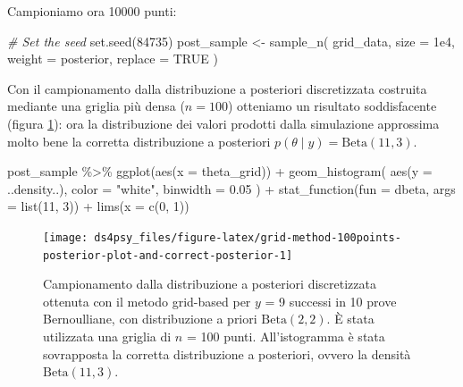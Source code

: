 \documentclass[
  11pt,
]{krantz}
\makeatletter
\newenvironment{Shaded}{\begin{snugshade}}{\end{snugshade}}
\newcommand{\AttributeTok}[1]{\textcolor[rgb]{0.61,0.61,0.61}{#1}}
\newcommand{\CommentTok}[1]{\textcolor[rgb]{0.37,0.37,0.37}{\textit{#1}}}
\newcommand{\ConstantTok}[1]{\textcolor[rgb]{0,0,0}{#1}}
\newcommand{\DecValTok}[1]{\textcolor[rgb]{0.06,0.06,0.06}{#1}}
\newcommand{\FloatTok}[1]{\textcolor[rgb]{0.06,0.06,0.06}{#1}}
\newcommand{\FunctionTok}[1]{\textcolor[rgb]{0,0,0}{#1}}
\newcommand{\NormalTok}[1]{#1}
\newcommand{\OtherTok}[1]{\textcolor[rgb]{0.37,0.37,0.37}{#1}}
\newcommand{\SpecialCharTok}[1]{\textcolor[rgb]{0,0,0}{#1}}
\newcommand{\StringTok}[1]{\textcolor[rgb]{0.5,0.5,0.5}{#1}}
\newenvironment{kframe}{%
\medskip{}
\setlength{\fboxsep}{.8em}
 \def\at@end@of@kframe{}%
 \ifinner\ifhmode%
  \def\at@end@of@kframe{\end{minipage}}%
  \begin{minipage}{\columnwidth}%
 \fi\fi%
 \def\FrameCommand##1{\hskip\@totalleftmargin \hskip-\fboxsep
 \colorbox{shadecolor}{##1}\hskip-\fboxsep
     \hskip-\linewidth \hskip-\@totalleftmargin \hskip\columnwidth}%
 \MakeFramed {\advance\hsize-\width
   \@totalleftmargin\z@ \linewidth\hsize
   \@setminipage}}%
 {\par\unskip\endMakeFramed%
 \at@end@of@kframe}
\renewenvironment{Shaded}{\begin{kframe}}{\end{kframe}}
\theoremstyle{definition}
\theoremstyle{definition}
\theoremstyle{definition}
\theoremstyle{definition}
\theoremstyle{remark}
\makeatother
\begin{document}
Campioniamo ora 10000 punti:

\begin{Shaded}
\begin{Highlighting}[]
\CommentTok{\# Set the seed}
\FunctionTok{set.seed}\NormalTok{(}\DecValTok{84735}\NormalTok{)}
\NormalTok{post\_sample }\OtherTok{\textless{}{-}} \FunctionTok{sample\_n}\NormalTok{(}
\NormalTok{  grid\_data,}
  \AttributeTok{size =} \FloatTok{1e4}\NormalTok{,}
  \AttributeTok{weight =}\NormalTok{ posterior,}
  \AttributeTok{replace =} \ConstantTok{TRUE}
\NormalTok{)}
\end{Highlighting}
\end{Shaded}

Con il campionamento dalla distribuzione a posteriori discretizzata costruita mediante una griglia più densa (\(n = 100\)) otteniamo un risultato soddisfacente (figura \ref{fig:grid-method-100points-posterior-plot-and-correct-posterior}): ora la distribuzione dei valori prodotti dalla simulazione approssima molto bene la corretta distribuzione a posteriori \(p(\theta \mid y) = \mbox{Beta}(11, 3)\).

\begin{Shaded}
\begin{Highlighting}[]
\NormalTok{post\_sample }\SpecialCharTok{\%\textgreater{}\%}
  \FunctionTok{ggplot}\NormalTok{(}\FunctionTok{aes}\NormalTok{(}\AttributeTok{x =}\NormalTok{ theta\_grid)) }\SpecialCharTok{+}
  \FunctionTok{geom\_histogram}\NormalTok{(}
    \FunctionTok{aes}\NormalTok{(}\AttributeTok{y =}\NormalTok{ ..density..),}
    \AttributeTok{color =} \StringTok{"white"}\NormalTok{,}
    \AttributeTok{binwidth =} \FloatTok{0.05}
\NormalTok{  ) }\SpecialCharTok{+}
  \FunctionTok{stat\_function}\NormalTok{(}\AttributeTok{fun =}\NormalTok{ dbeta, }\AttributeTok{args =} \FunctionTok{list}\NormalTok{(}\DecValTok{11}\NormalTok{, }\DecValTok{3}\NormalTok{)) }\SpecialCharTok{+}
  \FunctionTok{lims}\NormalTok{(}\AttributeTok{x =} \FunctionTok{c}\NormalTok{(}\DecValTok{0}\NormalTok{, }\DecValTok{1}\NormalTok{))}
\end{Highlighting}
\end{Shaded}

\begin{figure}[h]

{\centering \texttt{[image: ds4psy\_files/figure-latex/grid-method-100points-posterior-plot-and-correct-posterior-1]} 

}

\caption{Campionamento dalla  distribuzione a posteriori discretizzata ottenuta con il metodo grid-based per $y$ = 9 successi in 10 prove Bernoulliane, con distribuzione a priori $\mbox{Beta}(2, 2)$. È stata utilizzata una griglia di $n$ = 100 punti. All'istogramma è stata sovrapposta la corretta distribuzione a posteriori, ovvero la densità $\mbox{Beta}(11, 3)$.}\label{fig:grid-method-100points-posterior-plot-and-correct-posterior}
\end{figure}
\end{document}
